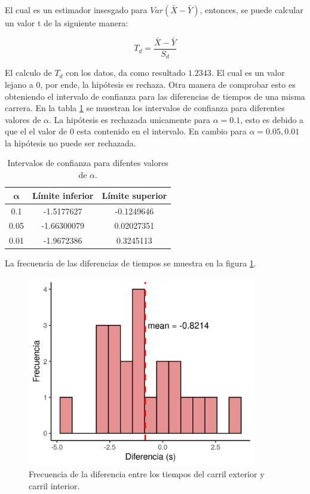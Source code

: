 El cual es un estimador insesgado para $Var(\bar{X}-\bar{Y})$, entonces, se puede calcular un valor t de la siguiente manera:

\begin{equation*}
	T_d = \frac{\bar{X}-\bar{Y}}{S_d}
\end{equation*}

El calculo de $T_d$ con los datos, da como resultado $1.2343$. El cual es un valor lejano a 0, por ende, la hipótesis es rechaza. Otra manera de comprobar esto es obteniendo el intervalo de confianza para las diferencias de tiempos de una misma carrera. En la tabla \ref{table:problema7_intervalo_de_confianza} se muestran los intervalos de confianza para diferentes valores de $\alpha$. La hipótesis es rechazada unicamente para $\alpha = 0.1$, esto es debido a que el el valor de 0 esta contenido en el intervalo. En cambio para $\alpha=0.05,0.01$ la hipótesis no puede ser rechazada.

\begin{table}[H]
	\centering
	\begin{tabular}{ccc} \hline
		$\mathbf{\alpha}$ & \textbf{Límite inferior} & \textbf{Límite superior} \\ \hline
		0.1               & -1.5177627               & -0.1249646               \\
		0.05              & -1.66300079              & 0.02027351               \\
		0.01              & -1.9672386               & 0.3245113                \\ \hline
	\end{tabular}
	\caption{Intervalos de confianza para difentes valores de $\alpha$.}
	\label{table:problema7_intervalo_de_confianza}
\end{table}

La frecuencia de las diferencias de tiempos se muestra en la figura \ref{fig:problema07_histogram}.

\begin{figure}[H]
	\centering
	\includegraphics[width=10cm]{Graphics/problema07_histogram.png}
	\caption{Frecuencia de la diferencia entre los tiempos del carril exterior y carril interior.}
	\label{fig:problema07_histogram}
\end{figure}
